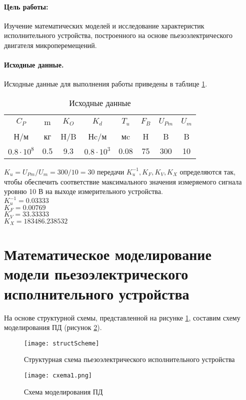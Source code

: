 \documentclass[12pt,a4paper]{article}
\begin{document}

\setcounter{page}{2}

\paragraph{Цель работы:}Изучение математических моделей и исследование характеристик исполнительного устройства, построенного на основе пьезоэлектрического двигателя микроперемещений.
\paragraph{Исходные данные.}

Исходные данные для выполнения работы приведены в таблице \ref{Tab1}.
\begin{table}[h!]
	\renewcommand{\arraystretch}{1.3} %
	\renewcommand{\tabcolsep}{0.3cm} %
	\centering
	\begin{threeparttable}
    \caption{Исходные данные}
    \begin{tabular}{|c|c|c|c|c|c|c|c|}
    \hline $C_P$ & m & $K_O$ & $K_d$ & $T_u$ & $F_B$ & $U_{Pm}$ & $U_m$\\
    Н/м & кг & H/B & Нc/м & мc & H & B & B\\
    \hline $0.8\cdot10^8$ & 0.5 & 9.3 & $0.8\cdot10^3$ & 0.08 & 75 & 300 & 10\\
    \hline
    \end{tabular} 
    \label{Tab1}
    \end{threeparttable}
\end{table}

$K_u=U_{Pm}/U_m=300/10=30$
 передачи $K_u^{-1}, K_F, K_V, K_X$ определяются так, чтобы обеспечить соответствие максимального значения измеряемого сигнала уровню 10 В на выходе измерительного устройства.\\ 
$K_u^{-1} = 0.03333$\\
$K_F = 0.00769$\\
$K_V = 33.33333$\\
$K_X = 183486.238532$

\newpage
\section{Математическое моделирование модели пьезоэлектрического исполнительного устройства}	 
На основе структурной схемы, представленной на рисунке \ref{structScheme}, составим схему моделирования ПД (рисунок \ref{cxema1.png}).
\begin{figure}[ht!]
	\centering
	\texttt{[image: structScheme]}
	\caption{Структурная схема пьезоэлектрического исполнительного устройства}
	\label{structScheme}
\end{figure}
\begin{figure}[ht!]
	\centering
	\texttt{[image: cxema1.png]}
	\caption{Схема моделирования ПД}
	\label{cxema1.png}
\end{figure}
\end{document}
